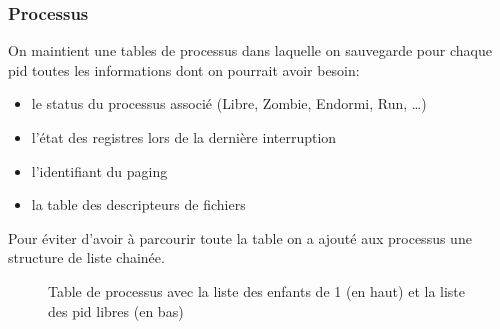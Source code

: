 \documentclass[10pt,a4paper]{beamer}
\begin{document}
\begin{frame}
  \frametitle{Processus}

  On maintient une tables de processus dans laquelle on sauvegarde pour chaque pid toutes les informations dont on pourrait avoir besoin:

  \begin{itemize}
  \item le status du processus associé (\textrm{Libre}, \textrm{Zombie}, \textrm{Endormi}, \textrm{Run}, \ldots)
  \item l'état des registres lors de la dernière interruption
  \item l'identifiant du paging
  \item la table des descripteurs de fichiers
  \end{itemize}

  Pour éviter d'avoir à parcourir toute la table on a ajouté aux processus une structure de liste chainée.

  \begin{figure}
    \begin{center}
      \caption{Table de processus avec la liste des enfants de 1 (en haut) et la liste des pid libres (en bas)}
    \end{center}
  \end{figure}
\end{frame}
\end{document}
